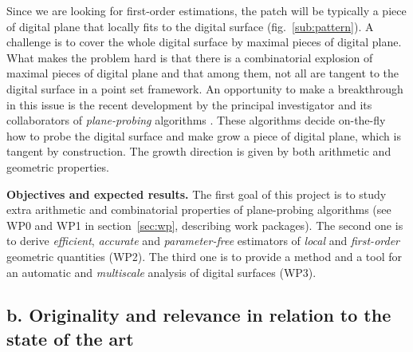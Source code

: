 Since we are looking for first-order estimations, the patch will be typically a piece of digital plane
that locally fits to the digital surface (fig.~\ref{sub:pattern}).
A challenge is to cover the whole digital surface by maximal pieces of digital plane. 
What makes the problem hard is that there is a combinatorial explosion
of maximal pieces of digital plane \cite{Sivignon2009} and that among them,
not all are tangent to the digital surface in a point set framework.  
An opportunity to make a breakthrough in this issue is the recent development
by the principal investigator and its collaborators of \emph{plane-probing}
algorithms \cite{LPRTCS2016, LPRDGCI2016, LPRJMIV2017}. These algorithms decide
on-the-fly how to probe the digital surface and make grow a piece of digital plane,
which is tangent by construction. The growth direction is given by both arithmetic and geometric properties.

\noindent\textbf{Objectives and expected results.}
The first goal of this project is to study extra arithmetic and combinatorial properties
of plane-probing algorithms (see WP0 and WP1 in section~\ref{sec:wp}, describing work packages).
The second one is to derive \emph{efficient}, \emph{accurate} and \emph{parameter-free} estimators
of \emph{local} and \emph{first-order} geometric quantities (WP2).
The third one is to provide a method and a tool for an automatic and \emph{multiscale} analysis of digital surfaces (WP3). 






\subsection{b. Originality and relevance in relation to the state of the art}

